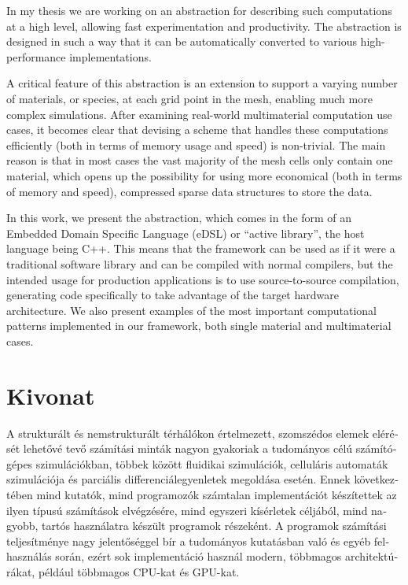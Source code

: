 \documentclass[fontsize=11pt, appendixprefix=true]{scrreprt}
\begin{document}
In my thesis we are working on an abstraction for describing such computations
at a high level, allowing fast experimentation and productivity. The abstraction
is designed in such a way that it can be automatically converted to various
high-performance implementations.

A critical feature of this abstraction is an extension to support a varying
number of materials, or species, at each grid point in the mesh, enabling much
more complex simulations. After examining real-world multimaterial computation
use cases, it becomes clear that devising a scheme that handles these
computations efficiently (both in terms of memory usage and speed) is
non-trivial. The main reason is that in most cases the vast majority of the mesh
cells only contain one material, which opens up the possibility for using more
economical (both in terms of memory and speed), compressed sparse data
structures to store the data.

In this work, we present the abstraction, which comes in the form of an Embedded
Domain Specific Language (eDSL) or ``active library'', the host language being
C++. This means that the framework can be used as if it were a traditional
software library and can be compiled with normal compilers, but the intended
usage for production applications is to use source-to-source compilation,
generating code specifically to take advantage of the target hardware
architecture. We also present examples of the most important computational
patterns implemented in our framework, both single material and multimaterial
cases.

\newpage
\section*{Kivonat}
\begin{otherlanguage}{magyar}
A strukturált és nemstrukturált térhálókon értelmezett, szomszédos elemek
elérését lehetővé tevő számítási minták nagyon gyakoriak a tudományos célú
számítógépes szimulációkban, többek között fluidikai szimulációk, celluláris
automaták szimulációja és parciális differenciálegyenletek megoldása
esetén. Ennek következtében mind kutatók, mind programozók számtalan
implementációt készítettek az ilyen típusú számítások elvégzésére, mind egyszeri
kísérletek céljából, mind nagyobb, tartós használatra készült programok
részeként. A programok számítási teljesítménye nagy jelentőséggel bír a
tudományos kutatásban való és egyéb felhasználás során, ezért sok implementáció
használ modern, többmagos architektúrákat, például többmagos CPU-kat és GPU-kat.

\end{otherlanguage}
\end{document}
